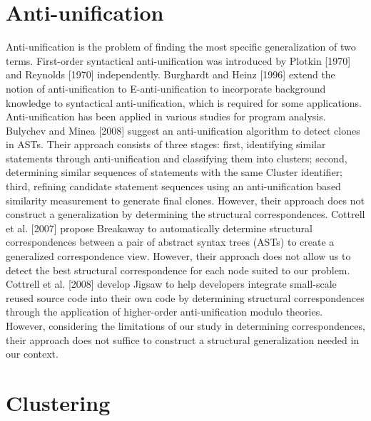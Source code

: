\section{Anti-unification}  \label{ch7-au}
Anti-unification is the problem of finding the most specific generalization of two terms. First-order syntactical anti-unification was introduced by Plotkin [1970] and Reynolds [1970] independently. Burghardt and Heinz [1996] extend the notion of anti-unification to E-anti-unification to incorporate background knowledge to syntactical anti-unification, which is required for some applications. Anti-unification has been applied in various studies for program analysis. Bulychev and Minea [2008] suggest an anti-unification algorithm to detect clones in ASTs. Their approach consists of three stages: first, identifying similar statements through anti-unification and classifying them into clusters; second, determining similar sequences of statements with the same Cluster identifier; third, refining candidate statement sequences using an anti-unification based similarity measurement to generate final clones. However, their approach does not construct a generalization by determining the structural correspondences. Cottrell et al. [2007] propose Breakaway to automatically determine structural correspondences between a pair of abstract syntax trees (ASTs) to create a generalized correspondence view. However, their approach does not allow us to detect the best structural correspondence for each node suited to our problem. Cottrell et al. [2008] develop Jigsaw to help developers integrate small-scale reused source code into their own code by determining structural correspondences through the application of higher-order anti-unification modulo theories. However, considering the limitations of our study in determining correspondences, their approach does not suffice to  construct a structural generalization needed in our context.


\section{Clustering}  \label{ch7-clustering}

